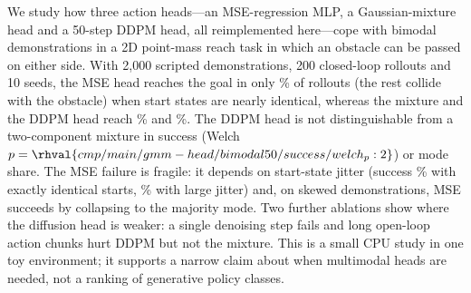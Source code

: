 We study how three action heads---an MSE-regression MLP, a Gaussian-mixture head and a 50-step DDPM head, all reimplemented here---cope with bimodal demonstrations in a 2D point-mass reach task in which an obstacle can be passed on either side. With 2,000 scripted demonstrations, 200 closed-loop rollouts and 10 seeds, the MSE head reaches the goal in only \% of rollouts (the rest collide with the obstacle) when start states are nearly identical, whereas the mixture and the DDPM head reach \% and \%. The DDPM head is not distinguishable from a two-component mixture in success (Welch $p=\rhval{cmp/main/gmm-head/bimodal50/success/welch_p:2}$) or mode share. The MSE failure is fragile: it depends on start-state jitter (success \% with exactly identical starts, \% with large jitter) and, on skewed demonstrations, MSE succeeds by collapsing to the majority mode. Two further ablations show where the diffusion head is weaker: a single denoising step fails and long open-loop action chunks hurt DDPM but not the mixture. This is a small CPU study in one toy environment; it supports a narrow claim about when multimodal heads are needed, not a ranking of generative policy classes.
